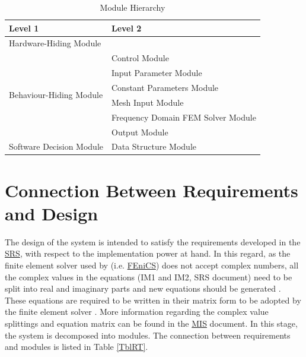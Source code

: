 \documentclass[12pt, titlepage]{article}
\begin{document}
	
	\begin{table}[h!] \centering \begin{tabular}{p{} p{}}
			\toprule \textbf{Level 1} & \textbf{Level 2}\\ \midrule
			
			{Hardware-Hiding Module} & ~ \\ \midrule
			
			\multirow{6}{0.3\textwidth}{Behaviour-Hiding Module} & \progname{} Control
			Module\\ & Input Parameter Module\\ & Constant Parameters Module\\ & Mesh Input
			Module\\ & Frequency Domain FEM Solver Module\\ & Output Module\\
			
			\midrule
			
			\multirow{1}{0.3\textwidth}{Software Decision Module} & Data Structure Module\\ \bottomrule
			
		\end{tabular} \caption{Module Hierarchy} \label{TblMH} \end{table}
	
	\section{Connection Between Requirements and Design} \label{SecConnection}
	
	The design of the system is intended to satisfy the requirements developed in
	the \href{https://github.com/shmouses/SPDFM/tree/master/docs/SRS}{SRS}, with respect to the implementation power at hand. In this regard, as the finite element solver used by \progname{} (i.e. \href{https://fenicsproject.org/}{FEniCS}) does not accept complex numbers, all the complex values in the equations (IM1 and IM2, SRS document) need to be split into real and imaginary parts and new equations should be generated \citep{rochlitz2019custem, otto2012using}. These equations are required to be written in their matrix form to be adopted by the finite element solver \citep{otto2012using}. More information regarding the complex value splittings and equation matrix can be found in the \href{https://github.com/shmouses/SPDFM/tree/master/docs/Design/MIS}{MIS} document. In this stage, the system is decomposed into modules. The connection between requirements and modules is listed in Table \ref{TblRT}.
	
\end{document}

